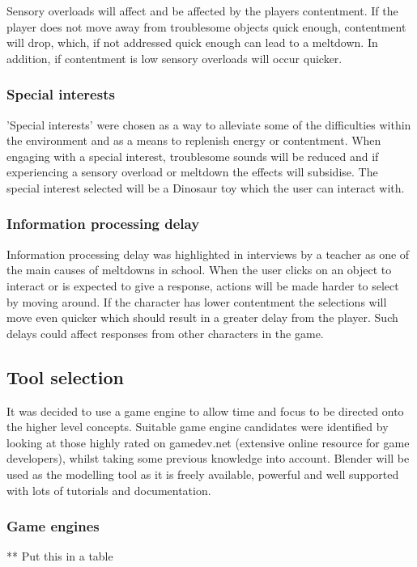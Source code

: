 \documentclass[11pt]{report}
\begin{document}
Sensory overloads will affect and be affected by the players contentment. If the player does not move away from troublesome objects quick enough, contentment will drop, which, if not addressed quick enough can lead to a meltdown. In addition, if contentment is low sensory overloads will occur quicker. 

\subsubsection{Special interests}
'Special interests' were chosen as a way to alleviate some of the difficulties within the environment and as a means to replenish energy or contentment. When engaging with a special interest, troublesome sounds will be reduced and if experiencing a sensory overload or meltdown the effects will subsidise. The special interest selected will be a Dinosaur toy which the user can interact with.

\subsubsection{Information processing delay}
Information processing delay was highlighted in interviews by a teacher as one of the main causes of meltdowns in school. When the user clicks on an object to interact or is expected to give a response, actions will be made harder to select by moving around. If the character has lower contentment the selections will move even quicker which should result in a greater delay from the player. Such delays could affect responses from other characters in the game. 

\subsection{Tool selection}
It was decided to use a game engine to allow time and focus to be directed onto the higher level concepts. Suitable game engine candidates were identified by looking at those highly rated on gamedev.net (extensive online resource for game developers), whilst taking some previous knowledge into account. Blender will be used as the modelling tool as it is freely available, powerful and well supported with lots of tutorials and documentation.

\subsubsection{Game engines}

** Put this in a table
\end{document}
